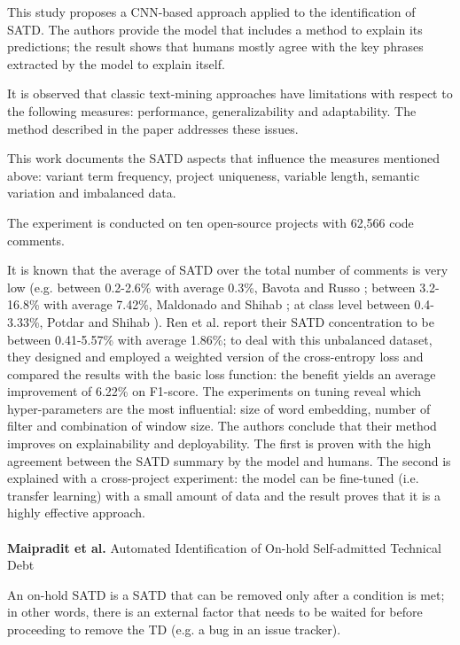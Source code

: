 This study proposes a CNN-based approach applied to the identification of SATD. The authors provide the model that includes a method to explain its predictions; the result shows that humans mostly agree with the key phrases extracted by the model to explain itself.

It is observed that classic text-mining approaches have limitations with respect to the following measures: performance, generalizability and adaptability. The method described in the paper addresses these issues.

This work documents the SATD aspects that influence the measures mentioned above: variant term frequency, project uniqueness, variable length, semantic variation and imbalanced data.

The experiment is conducted on ten open-source projects with 62,566 code comments.

It is known that the average of SATD over the total number of comments is very low (e.g. between 0.2-2.6\% with average 0.3\%, Bavota and Russo \cite{bavota2016large}; between 3.2-16.8\% with average 7.42\%, Maldonado and Shihab \cite{maldonado2015detecting}; at class level between 0.4-3.33\%, Potdar and Shihab \cite{potdar2014exploratory}). 
Ren et al. report their SATD concentration to be between 0.41-5.57\% with average 1.86\%; to deal with this unbalanced dataset, they designed and employed a weighted version of the cross-entropy loss and compared the results with the basic loss function: the benefit yields an average improvement of 6.22\% on F1-score.
The experiments on tuning reveal which hyper-parameters are the most influential: size of word embedding, number of filter and combination of window size.
The authors conclude that their method improves on explainability and deployability. The first is proven with the high agreement between the SATD summary by the model and humans. The second is explained with a cross-project experiment: the model can be fine-tuned (i.e. transfer learning) with a small amount of data and the result proves that it is a highly effective approach.
\\
\\
\textbf{Maipradit et al.} \cite{maipradit2020automated} Automated Identification of On-hold Self-admitted Technical Debt

An on-hold SATD is a SATD that can be removed only after a condition is met; in other words, there is an external factor that needs to be waited for before proceeding to remove the TD (e.g. a bug in an issue tracker). 


